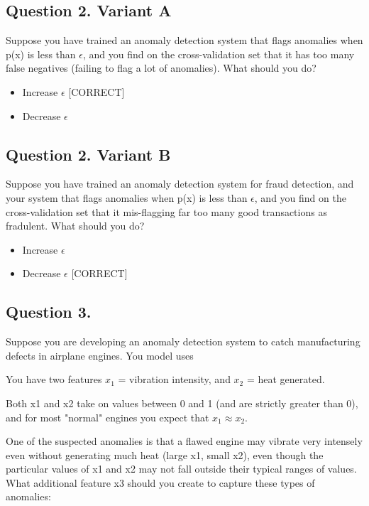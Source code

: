 \documentclass[11pt]{article} %
\begin{document}
\subsection*{Question 2. Variant A}
Suppose you have trained an anomaly detection system that flags anomalies when p(x) is less than $\epsilon$, and you find on the cross-validation set that it has 
too many false negatives (failing to flag a lot of anomalies). What should you do?


\begin{itemize}
	\item Increase $\epsilon$ [CORRECT]
	\item Decrease $\epsilon$
\end{itemize}

\subsection*{Question 2. Variant B}
Suppose you have trained an anomaly detection system for fraud detection, and your system that flags 
anomalies when p(x) is less than $\epsilon$, and you find on the 
cross-validation set that it mis-flagging far too many good transactions as fradulent. What should you do?

\begin{itemize}
	\item Increase $\epsilon$ 
	\item Decrease $\epsilon$ [CORRECT]
\end{itemize}

\subsection*{Question 3. }
Suppose you are developing an anomaly detection system to catch manufacturing defects in airplane engines. You model uses


You have two features $x_1$ = vibration intensity, and $x_2$ = heat generated. 

Both x1 and x2 take on values between 0 and 1 (and are strictly greater than 0), and for most "normal" engines you expect that $x_1 \approx x_2$. 

One of the suspected anomalies is that a flawed engine may vibrate very intensely even without generating much heat (large x1, small x2), even though the particular values of x1 and x2 may not fall outside their typical ranges of values. What additional feature x3 should you create to capture these types of anomalies:
\end{document}
